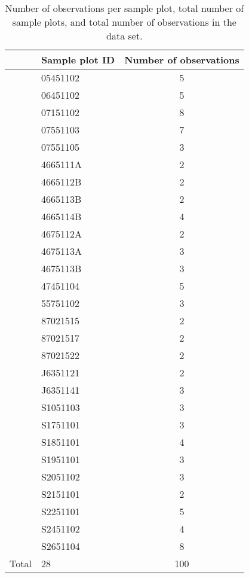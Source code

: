 \newpage{}  %
\begin{singlespace}
  {\tabulinesep=2mm
    \begin{longtabu}{l L S[table-figures-decimal = 0]}
      \caption{Number of observations per sample plot, total number of sample plots, and total number of observations in the \Spruce{} data set. \label{tab:ObservationsCountPerEdvidSpruce}} \\
      \toprule
      & Sample plot ID & {Number of observations}  \\
      \midrule
      \endhead
      \bottomrule
      \endlastfoot
      & 05451102 & 5 \\
      & 06451102 & 5 \\
      & 07151102 & 8 \\
      & 07551103 & 7 \\
      & 07551105 & 3 \\
      & 4665111A & 2 \\
      & 4665112B & 2 \\
      & 4665113B & 2 \\
      & 4665114B & 4 \\
      & 4675112A & 2 \\
      & 4675113A & 3 \\
      & 4675113B & 3 \\
      & 47451104 & 5 \\
      & 55751102 & 3 \\
      & 87021515 & 2 \\
      & 87021517 & 2 \\
      & 87021522 & 2 \\
      & J6351121 & 2 \\
      & J6351141 & 3 \\
      & S1051103 & 3 \\
      & S1751101 & 3 \\
      & S1851101 & 4 \\
      & S1951101 & 3 \\
      & S2051102 & 3 \\
      & S2151101 & 2 \\
      & S2251101 & 5 \\
      & S2451102 & 4 \\
      & S2651104 & 8 \\
      Total & 28 & 100 \\
    \end{longtabu}
  }
\end{singlespace}

